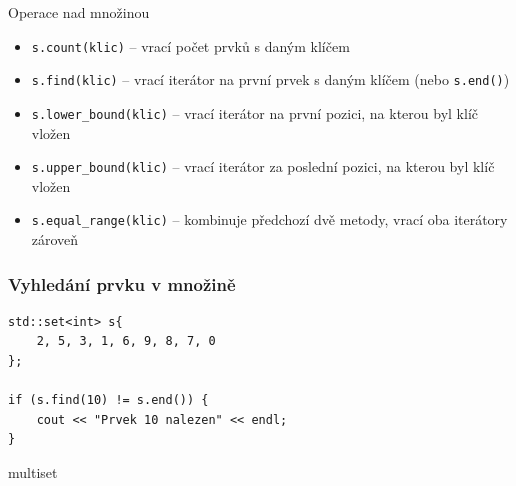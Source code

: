 \begin{frame}[fragile]
\begin{block}{Operace nad množinou}
\begin{itemize}
\item \lstinline|s.count(klic)| -- vrací počet prvků s daným klíčem
\item \lstinline|s.find(klic)| -- vrací iterátor na první prvek s daným klíčem (nebo \lstinline|s.end()|)

\item \lstinline|s.lower_bound(klic)| -- vrací iterátor na první pozici, na kterou byl klíč vložen
\item \lstinline|s.upper_bound(klic)| -- vrací iterátor za poslední pozici, na kterou byl klíč vložen
\item \lstinline|s.equal_range(klic)| -- kombinuje předchozí dvě metody, vrací oba iterátory zároveň
\end{itemize}
\end{block}
\end{frame}

\begin{frame}[fragile]
\frametitle{Vyhledání prvku v množině}
\begin{yesblock}
\begin{lstlisting}
std::set<int> s{
	2, 5, 3, 1, 6, 9, 8, 7, 0
};

if (s.find(10) != s.end()) {
	cout << "Prvek 10 nalezen" << endl;
}
\end{lstlisting}
\end{yesblock}
\end{frame}












\begin{frame}[fragile]
\begin{block}{multiset}
\end{block}
\end{frame}


